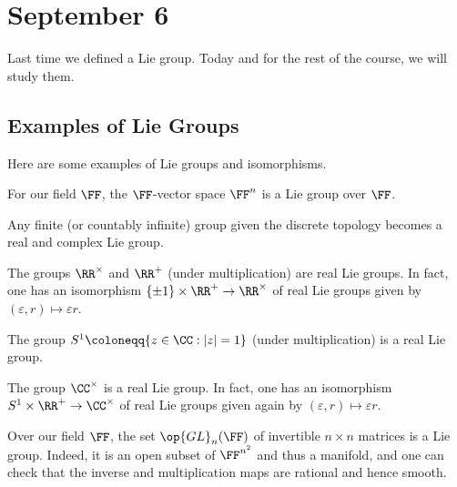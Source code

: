 \documentclass[../notes.tex]{subfiles}
\begin{document}
\section{September 6}
Last time we defined a Lie group. Today and for the rest of the course, we will study them.

\subsection{Examples of Lie Groups}
Here are some examples of Lie groups and isomorphisms.
\begin{example}
	For our field $\FF$, the $\FF$-vector space $\FF^n$ is a Lie group over $\FF$.
\end{example}
\begin{example} \label{ex:finite-lie-group}
	Any finite (or countably infinite) group given the discrete topology becomes a real and complex Lie group.
\end{example}
\begin{example}
	The groups $\RR^\times$ and $\RR^+$ (under multiplication) are real Lie groups. In fact, one has an isomorphism $\{\pm1\}\times\RR^+\to\RR^\times$ of real Lie groups given by $(\varepsilon,r)\mapsto\varepsilon r$.
\end{example}
\begin{example}
	The group $S^1\coloneqq\{z\in\CC:\left|z\right|=1\}$ (under multiplication) is a real Lie group.
\end{example}
\begin{example}
	The group $\CC^\times$ is a real Lie group. In fact, one has an isomorphism $S^1\times\RR^+\to\CC^\times$ of real Lie groups given again by $(\varepsilon,r)\mapsto\varepsilon r$.
\end{example}
\begin{example}
	Over our field $\FF$, the set $\op{GL}_n(\FF)$ of invertible $n\times n$ matrices is a Lie group. Indeed, it is an open subset of $\FF^{n^2}$ and thus a manifold, and one can check that the inverse and multiplication maps are rational and hence smooth.
\end{example}
\end{document}
